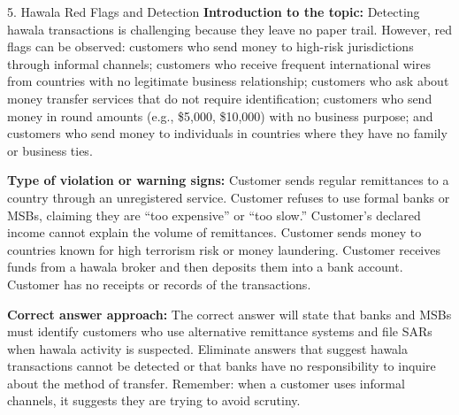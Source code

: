 \documentclass[11pt,a4paper]{beamer}
\begin{document}
\begin{frame}{5. Hawala Red Flags and Detection}
\tiny
\noindent\textbf{Introduction to the topic:} Detecting hawala transactions is challenging because they leave no paper trail. However, red flags can be observed: customers who send money to high-risk jurisdictions through informal channels; customers who receive frequent international wires from countries with no legitimate business relationship; customers who ask about money transfer services that do not require identification; customers who send money in round amounts (e.g., \$5,000, \$10,000) with no business purpose; and customers who send money to individuals in countries where they have no family or business ties.

\vspace{0.1cm}
\noindent\textbf{Type of violation or warning signs:} Customer sends regular remittances to a country through an unregistered service. Customer refuses to use formal banks or MSBs, claiming they are “too expensive” or “too slow.” Customer's declared income cannot explain the volume of remittances. Customer sends money to countries known for high terrorism risk or money laundering. Customer receives funds from a hawala broker and then deposits them into a bank account. Customer has no receipts or records of the transactions.

\vspace{0.1cm}
\noindent\textbf{Correct answer approach:} The correct answer will state that banks and MSBs must identify customers who use alternative remittance systems and file SARs when hawala activity is suspected. Eliminate answers that suggest hawala transactions cannot be detected or that banks have no responsibility to inquire about the method of transfer. Remember: when a customer uses informal channels, it suggests they are trying to avoid scrutiny.
\end{frame}
\end{document}
